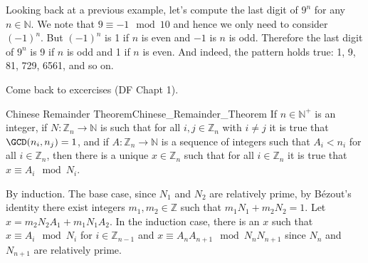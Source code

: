 \documentclass{article}                                                        %
\begin{document}
            \begin{example}
                Looking back at a previous example, let's compute the last digit of
                $9^{n}$ for any $n\in\mathbb{N}$. We note that
                $9\equiv\minus{1}\mod{10}$ and hence we only need to consider
                $(\minus{1})^{n}$. But $(\minus{1})^{n}$ is 1 if $n$ is even and
                $\minus{1}$ is $n$ is odd. Therefore the last digit of $9^{n}$ is
                9 if $n$ is odd and 1 if $n$ is even. And indeed, the pattern holds
                true: 1, 9, 81, 729, 6561, and so on.
            \end{example}
            Come back to excercises (DF Chapt 1).
            \begin{ftheorem}{Chinese Remainder Theorem}{Chinese_Remainder_Theorem}
                If $n\in\mathbb{N}^{+}$ is an integer, if
                $N:\mathbb{Z}_{n}\rightarrow\mathbb{N}$ is such that for all
                $i,j\in\mathbb{Z}_{n}$ with $i\ne{j}$ it is true that
                $\GCD(n_{i},n_{j})=1$, and if
                $A:\mathbb{Z}_{n}\rightarrow\mathbb{N}$ is a sequence of integers
                such that $A_{i}<n_{i}$ for all $i\in\mathbb{Z}_{n}$, then there is
                a unique $x\in\mathbb{Z}_{n}$ such that for all $i\in\mathbb{Z}_{n}$
                it is true that $x\equiv{A}_{i}\mod{N}_{i}$.
            \end{ftheorem}
            \begin{bproof}
                By induction. The base case, since $N_{1}$ and $N_{2}$ are
                relatively prime, by B\'{e}zout's identity there exist integers
                $m_{1},m_{2}\in\mathbb{Z}$ such that $m_{1}N_{1}+m_{2}N_{2}=1$.
                Let $x=m_{2}N_{2}A_{1}+m_{1}N_{1}A_{2}$. In the induction case,
                there is an $x$ such that $x\equiv{A}_{i}\mod{N}_{i}$ for
                $i\in\mathbb{Z}_{n-1}$ and $x\equiv{A}_{n}A_{n+1}\mod{N}_{n}N_{n+1}$
                since $N_{n}$ and $N_{n+1}$ are relatively prime.
            \end{bproof}
\end{document}
